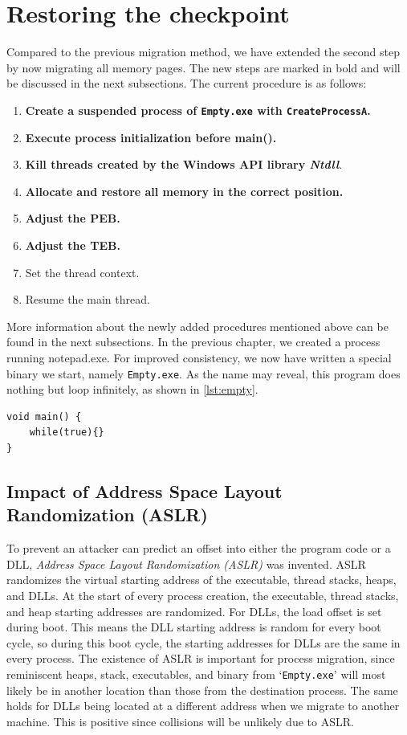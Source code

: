 \documentclass[a4paper, 11pt, english]{report}
\begin{document}
\section{Restoring the checkpoint}
\label{sec:memory-restoring-checkpoint}
Compared to the previous migration method, we have extended the second step by now migrating all memory pages. The new steps are marked in bold and will be discussed in the next subsections. The current procedure is as follows:

\begin{enumerate}
	\item \textbf{Create a suspended process of \texttt{Empty.exe} with \texttt{CreateProcessA}.}
	\item \textbf{Execute process initialization before main().}
	\item \textbf{Kill threads created by the Windows API library \textit{Ntdll}}.
	\item \textbf{Allocate and restore all memory in the correct position.}
	\item \textbf{Adjust the PEB.}
	\item \textbf{Adjust the TEB.}
	\item Set the thread context.
	\item Resume the main thread.
\end{enumerate}

More information about the newly added procedures mentioned above can be found in the next subsections.
In the previous chapter, we created a process running notepad.exe. For improved consistency, we now have written a special binary we start, namely \texttt{Empty.exe}. As the name may reveal, this program does nothing but loop infinitely, as shown in \autoref{lst:empty}.

\begin{lstlisting}[float=h,label=lst:empty,language={[Visual]C++},caption={All code of \texttt{Empty.exe}}]
void main() {
	while(true){}
}
\end{lstlisting}

\subsection{Impact of Address Space Layout Randomization (ASLR)}
\label{sec:aslr}
To prevent an attacker can predict an offset into either the program code or a DLL, \textit{Address Space Layout Randomization (ASLR)} was invented. ASLR randomizes the virtual starting address of the executable, thread stacks, heaps, and DLLs. At the start of every process creation, the executable, thread stacks, and heap starting addresses are randomized. For DLLs, the load offset is set during boot. This means the DLL starting address is random for every boot cycle, so during this boot cycle, the starting addresses for DLLs are the same in every process.
The existence of ASLR is important for process migration, since reminiscent heaps, stack, executables, and binary from `\texttt{Empty.exe}' will most likely be in another location than those from the destination process. The same holds for DLLs being located at a different address when we migrate to another machine. This is positive since collisions will be unlikely due to ASLR.
\end{document}
